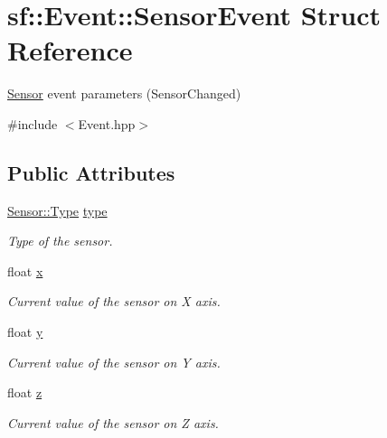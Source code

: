 \hypertarget{structsf_1_1_event_1_1_sensor_event}{}\section{sf\+:\+:Event\+:\+:Sensor\+Event Struct Reference}
\label{structsf_1_1_event_1_1_sensor_event}


\mbox{\hyperlink{classsf_1_1_sensor}{Sensor}} event parameters (Sensor\+Changed)  




{\ttfamily \#include $<$Event.\+hpp$>$}

\subsection*{Public Attributes}
\begin{DoxyCompactItemize}
\item 
\mbox{\label{structsf_1_1_event_1_1_sensor_event_abee7d67bf0947fd1138e4466011e2436}} 
\mbox{\hyperlink{classsf_1_1_sensor_a687375af3ab77b818fca73735bcaea84}{Sensor\+::\+Type}} \mbox{\hyperlink{structsf_1_1_event_1_1_sensor_event_abee7d67bf0947fd1138e4466011e2436}{type}}
\begin{DoxyCompactList}\small\item\em Type of the sensor. \end{DoxyCompactList}\item 
\mbox{\label{structsf_1_1_event_1_1_sensor_event_aa6ccbd13c181b866a6467462158d93d9}} 
float \mbox{\hyperlink{structsf_1_1_event_1_1_sensor_event_aa6ccbd13c181b866a6467462158d93d9}{x}}
\begin{DoxyCompactList}\small\item\em Current value of the sensor on X axis. \end{DoxyCompactList}\item 
\mbox{\label{structsf_1_1_event_1_1_sensor_event_aecafcd25ecb3ba486e42284e4bb69a57}} 
float \mbox{\hyperlink{structsf_1_1_event_1_1_sensor_event_aecafcd25ecb3ba486e42284e4bb69a57}{y}}
\begin{DoxyCompactList}\small\item\em Current value of the sensor on Y axis. \end{DoxyCompactList}\item 
\mbox{\label{structsf_1_1_event_1_1_sensor_event_a5704e0d0b82b07f051cc858894f3ea43}} 
float \mbox{\hyperlink{structsf_1_1_event_1_1_sensor_event_a5704e0d0b82b07f051cc858894f3ea43}{z}}
\begin{DoxyCompactList}\small\item\em Current value of the sensor on Z axis. \end{DoxyCompactList}\end{DoxyCompactItemize}


